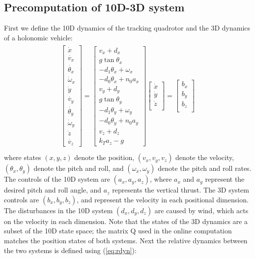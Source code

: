 \subsection{Precomputation of 10D-3D system}
First we define the 10D dynamics of the tracking quadrotor and the 3D dynamics of a holonomic vehicle:
\begin{equation}
\label{eq:Quad10D_dyn}
\begin{aligned}
\begin{array}{c}
\left[
\begin{array}{c}
\dot{x}\\
\dot{v_x}\\
\dot{\theta_x}\\
\dot\omega_x\\
\dot{y}\\
\dot{v_y}\\
\dot{\theta_y}\\
\dot\omega_y\\
\dot{z}\\
\dot{v_z}
\end{array}
\right]
=
\left[
\begin{array}{c}
v_x + d_x\\
g \tan \theta_x\\
-d_1 \theta_x + \omega_x\\
-d_0 \theta_x + n_0 a_x\\
v_y + d_y\\
g \tan \theta_y\\
-d_1 \theta_y + \omega_y\\
-d_0 \theta_y + n_0 a_y\\
v_z + d_z\\
k_T a_z - g
\end{array}
\right]
\left[
\begin{array}{c}
\dot{x}\\
\dot{y}\\
\dot{z}\\
\end{array}
\right] 
=
\left[
\begin{array}{c}
b_x\\
b_y\\
b_z \\
\end{array}
\right]
\end{array}\\
\end{aligned}
\end{equation}
where states $(x, y, z)$ denote the position, $(v_x, v_y, v_z)$ denote the velocity, $(\theta_x, \theta_y)$ denote the pitch and roll, and $(\omega_x, \omega_y)$ denote the pitch and roll rates. The controls of the 10D system are $(a_x, a_y, a_z)$, where $a_x$ and $a_y$ represent the desired pitch and roll angle, and $a_z$ represents the vertical thrust. The 3D system controls are $(b_x, b_y, b_z)$, and represent the velocity in each positional dimension. The disturbances in the 10D system $(d_x, d_y, d_z)$ are caused by wind, which acts on the velocity in each dimension. Note that the states of the 3D dynamics are a subset of the 10D state space; the matrix Q used in the online computation matches the position states of both systems. Next the relative dynamics between the two systems is defined using (\ref{eq:rdyn}):
